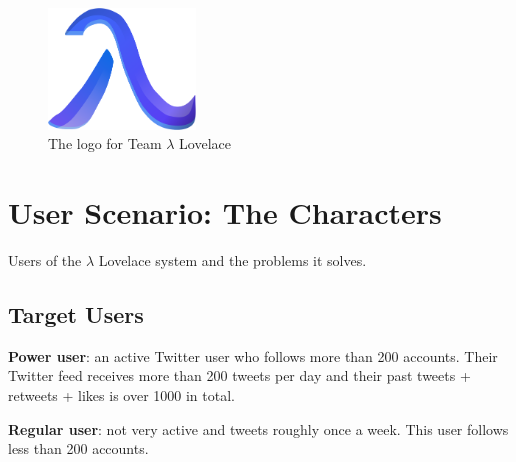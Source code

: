 \documentclass{article}
\begin{document}
\begin{figure}[H]
    \includegraphics[width=0.35\textwidth, center]{ll-logo}
    \caption{The logo for Team $\lambda$ Lovelace}
\end{figure}


\newpage


%
%
%
%
\section{User Scenario: The Characters} %

Users of the $\lambda$ Lovelace system and the problems it solves.

\subsection{Target Users}
\begin{itemize*}
    \item \textbf{Power user}: an active Twitter user who follows more than 200 accounts. Their Twitter feed receives more than 200 tweets per day and their past tweets + retweets + likes is over 1000 in total.
    \item \textbf{Regular user}: not very active and tweets roughly once a week. This user follows less than 200 accounts.
\end{itemize*} 
\end{document}
